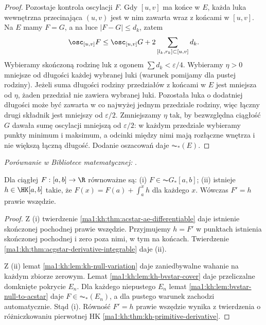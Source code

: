 \begin{proof}
Pozostaje kontrola oscylacji $F$. Gdy $[u,v]$ ma końce w $E$, każda luka wewnętrzna przecinająca $(u,v)$ jest w nim zawarta wraz z końcami w $[u,v]$. Na $E$ mamy $F=G$, a na luce $|F-G|\le d_k$, zatem
\[
 \osc_{[u,v]}F\le\osc_{[u,v]}G+
        2\sum_{[l_k,r_k]\subset[u,v]}d_k.
\]
Wybieramy skończoną rodzinę luk z ogonem $\sum d_k<\varepsilon/4$. Wybieramy $\eta>0$ mniejsze od długości każdej wybranej luki (warunek pomijamy dla pustej rodziny). Jeżeli suma długości rodziny przedziałów z końcami w $E$ jest mniejsza od $\eta$, żaden przedział nie zawiera wybranej luki. Pozostała luka o dodatniej długości może być zawarta w co najwyżej jednym przedziale rodziny, więc łączny drugi składnik jest mniejszy od $\varepsilon/2$. Zmniejszamy $\eta$ tak, by bezwzględna ciągłość $G$ dawała sumę oscylacji mniejszą od $\varepsilon/2$: w każdym przedziale wybieramy punkty minimum i maksimum, a odcinki między nimi mają rozłączne wnętrza i nie większą łączną długość. Dodanie oszacowań daje $\AC_*(E)$.
\end{proof}

\noindent\emph{Porównanie w Bibliotece matematycznej:} .

\begin{twierdzenie}
\label{ma1:kh:thm:kh-acgstar-characterization}\label{it:thm:kh-acgstar-characterization}
Dla ciągłej $F:[a,b]\to\R$ równoważne są: (i) $F\in\AC G_*[a,b]$; (ii) istnieje $h\in\HK[a,b]$ takie, że $F(x)=F(a)+\int_a^x h$ dla każdego $x$. Wówczas $F'=h$ prawie wszędzie.
\end{twierdzenie}
\begin{proof}
Z (i) twierdzenie \ref{ma1:kh:thm:acstar-ae-differentiable} daje istnienie skończonej pochodnej prawie wszędzie. Przyjmujemy $h=F'$ w punktach istnienia skończonej pochodnej i zero poza nimi, w tym na końcach. Twierdzenie \ref{ma1:kh:thm:acgstar-derivative-integrable} daje (ii).

Z (ii) lemat \ref{ma1:kh:lem:kh-null-variation} daje zaniedbywalne wahanie na każdym zbiorze zerowym. Lemat \ref{ma1:kh:lem:kh-bvstar-cover} daje przeliczalne domknięte pokrycie $E_n$. Dla każdego niepustego $E_n$ lemat \ref{ma1:kh:lem:bvstar-null-to-acstar} daje $F\in\AC_*(E_n)$, a dla pustego warunek zachodzi automatycznie. Stąd (i). Równość $F'=h$ prawie wszędzie wynika z twierdzenia o różniczkowaniu pierwotnej HK \ref{ma1:kh:thm:kh-primitive-derivative}.
\end{proof}

